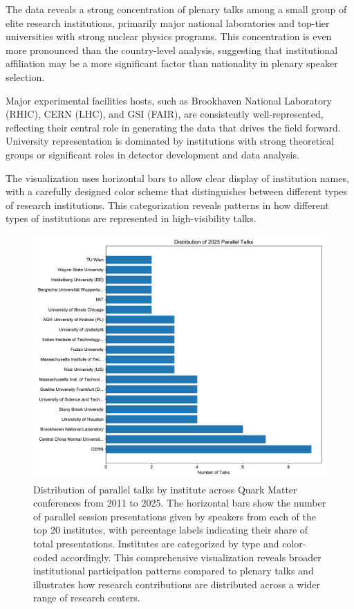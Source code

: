 \documentclass[a4paper,11pt]{article}
\begin{document}
The data reveals a strong concentration of plenary talks among a small group of elite research institutions, primarily major national laboratories and top-tier universities with strong nuclear physics programs. This concentration is even more pronounced than the country-level analysis, suggesting that institutional affiliation may be a more significant factor than nationality in plenary speaker selection.

Major experimental facilities hosts, such as Brookhaven National Laboratory (RHIC), CERN (LHC), and GSI (FAIR), are consistently well-represented, reflecting their central role in generating the data that drives the field forward. University representation is dominated by institutions with strong theoretical groups or significant roles in detector development and data analysis.

The visualization uses horizontal bars to allow clear display of institution names, with a carefully designed color scheme that distinguishes between different types of research institutions. This categorization reveals patterns in how different types of institutions are represented in high-visibility talks.

\begin{figure}[H]
\centering
\includegraphics[width=\textwidth]{figures/parallel_talks_by_institute.pdf}
\caption{Distribution of parallel talks by institute across Quark Matter conferences from 2011 to 2025. The horizontal bars show the number of parallel session presentations given by speakers from each of the top 20 institutes, with percentage labels indicating their share of total presentations. Institutes are categorized by type and color-coded accordingly. This comprehensive visualization reveals broader institutional participation patterns compared to plenary talks and illustrates how research contributions are distributed across a wider range of research centers.}
\label{fig:institute_parallel}
\end{figure}
\end{document}
